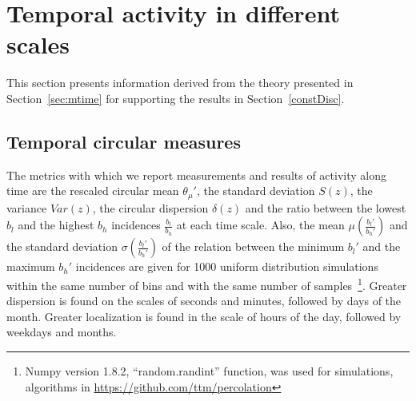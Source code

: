 \section{Temporal activity in different scales}\label{sec:time}
This section presents information derived from the theory presented in Section~\ref*{sec:mtime}
for supporting the results in Section~\ref*{constDisc}.

\subsection{Temporal circular measures}\label{si:circ}
The metrics with which we report measurements and results
of activity along time are the rescaled circular mean $\theta_\mu'$,
the standard deviation $S(z)$, the variance $Var(z)$, the circular dispersion $\delta(z)$
and the ratio between the lowest $b_l$ and the highest $b_h$ incidences $\frac{b_l}{b_h}$ at each time scale.
Also, the mean $\mu(\frac{b_l'}{b_h'})$ and 
the standard deviation $\sigma(\frac{b_l'}{b_h'})$ 
of the relation between the minimum $b_l'$ and the maximum $b_h'$ incidences
are given for 1000 uniform distribution simulations within the 
same number of bins and with the same number of samples~\footnote{Numpy version 1.8.2, ``random.randint'' function, was used for simulations, algorithms in \url{https://github.com/ttm/percolation}}.
Greater dispersion is found on the scales of seconds and minutes, followed
by days of the month.
Greater localization is found in the scale of hours of the day, followed by weekdays and months.

